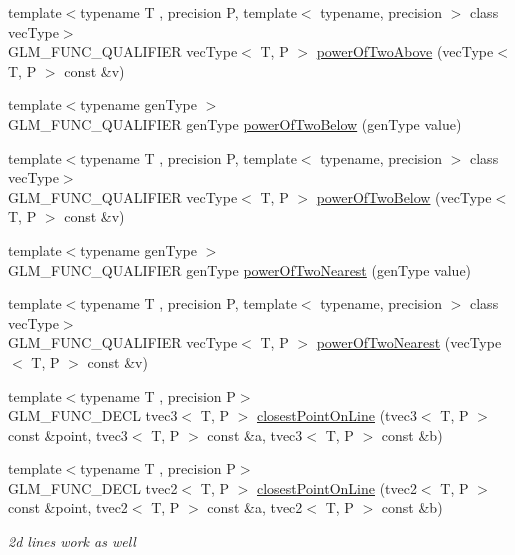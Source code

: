 \begin{DoxyCompactItemize}
{\footnotesize template$<$typename T , precision P, template$<$ typename, precision $>$ class vec\+Type$>$ }\\G\+L\+M\+\_\+\+F\+U\+N\+C\+\_\+\+Q\+U\+A\+L\+I\+F\+I\+E\+R vec\+Type$<$ T, P $>$ \hyperlink{group__gtx__bit_gafe08808a50226b75b50e640a08b32ddc}{power\+Of\+Two\+Above} (vec\+Type$<$ T, P $>$ const \&v)
\item 
{\footnotesize template$<$typename gen\+Type $>$ }\\G\+L\+M\+\_\+\+F\+U\+N\+C\+\_\+\+Q\+U\+A\+L\+I\+F\+I\+E\+R gen\+Type \hyperlink{namespaceglm_a895c5bb540f5f52ef2b7a81321a98627}{power\+Of\+Two\+Below} (gen\+Type value)
\item 
{\footnotesize template$<$typename T , precision P, template$<$ typename, precision $>$ class vec\+Type$>$ }\\G\+L\+M\+\_\+\+F\+U\+N\+C\+\_\+\+Q\+U\+A\+L\+I\+F\+I\+E\+R vec\+Type$<$ T, P $>$ \hyperlink{group__gtx__bit_gae33bb1ca2b55846b23a0f0796a679195}{power\+Of\+Two\+Below} (vec\+Type$<$ T, P $>$ const \&v)
\item 
{\footnotesize template$<$typename gen\+Type $>$ }\\G\+L\+M\+\_\+\+F\+U\+N\+C\+\_\+\+Q\+U\+A\+L\+I\+F\+I\+E\+R gen\+Type \hyperlink{namespaceglm_a90d716367872062cffce4a8cd51acd0c}{power\+Of\+Two\+Nearest} (gen\+Type value)
\item 
{\footnotesize template$<$typename T , precision P, template$<$ typename, precision $>$ class vec\+Type$>$ }\\G\+L\+M\+\_\+\+F\+U\+N\+C\+\_\+\+Q\+U\+A\+L\+I\+F\+I\+E\+R vec\+Type$<$ T, P $>$ \hyperlink{group__gtx__bit_ga2d7e85995d097518b8d70cd409bda39e}{power\+Of\+Two\+Nearest} (vec\+Type$<$ T, P $>$ const \&v)
\item 
{\footnotesize template$<$typename T , precision P$>$ }\\G\+L\+M\+\_\+\+F\+U\+N\+C\+\_\+\+D\+E\+C\+L tvec3$<$ T, P $>$ \hyperlink{group__gtx__closest__point_gac26353282a8213e469f5e33560c1200f}{closest\+Point\+On\+Line} (tvec3$<$ T, P $>$ const \&point, tvec3$<$ T, P $>$ const \&a, tvec3$<$ T, P $>$ const \&b)
\item 
{\footnotesize template$<$typename T , precision P$>$ }\\G\+L\+M\+\_\+\+F\+U\+N\+C\+\_\+\+D\+E\+C\+L tvec2$<$ T, P $>$ \hyperlink{group__gtx__closest__point_gadc7010070bb0cacd284f560299b21660}{closest\+Point\+On\+Line} (tvec2$<$ T, P $>$ const \&point, tvec2$<$ T, P $>$ const \&a, tvec2$<$ T, P $>$ const \&b)
\begin{DoxyCompactList}\small\item\em 2d lines work as well \end{DoxyCompactList}\item 

\end{DoxyCompactItemize}
